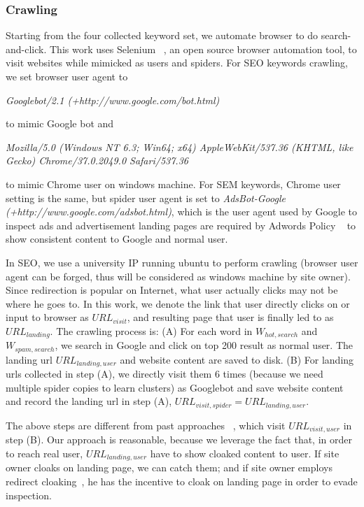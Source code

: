 \subsubsection{Crawling}
\label{sss:crawling}
Starting from the four collected keyword set, we automate browser to do
search-and-click. This work uses Selenium ~\cite{selenium}, an open source
browser automation tool, to visit websites while mimicked as users and spiders.
For SEO keywords crawling, we set browser user agent to 

{\it Googlebot/2.1
(+http://www.google.com/bot.html)}

to mimic Google bot and 

{\it Mozilla/5.0 (Windows NT 6.3; Win64; x64) AppleWebKit/537.36 (KHTML, like
Gecko) Chrome/37.0.2049.0 Safari/537.36}

to mimic Chrome user on windows
machine. For SEM keywords, Chrome user setting is the same, but spider user
agent is set to {\it AdsBot-Google (+http://www.google.com/adsbot.html)}, which
is the user agent used by Google to inspect ads and advertisement landing pages
are required by Adwords Policy ~\cite{google-ad-policy} to show consistent 
content to Google and normal user.

In SEO, we use a university IP running ubuntu to perform crawling (browser user
agent can be forged, thus will be considered as windows machine by site owner).
Since redirection is popular on Internet, what user actually clicks may not be
where he goes to. In this work, we denote the link that user directly clicks on
or input to browser as $URL_{visit}$, and resulting page that user is finally
led to as $URL_{landing}$.
The crawling process is: 
(A) For each word in $W_{hot, search}$ and $W_{spam, search}$, we search in Google
and click on top 200 result as normal user. The landing url $URL_{landing, user}$ 
and website content are saved to disk. 
(B) For landing urls collected in step (A), we directly visit them 6 times
(because we need multiple spider copies to learn clusters) as Googlebot and
save website content and record the landing url in step (A), $URL_{visit,
spider} = URL_{landing, user}$.

The above steps are different from past approaches ~\cite{lin2009detection,
wu2005cloaking, wang2011cloak}, which visit $URL_{visit, user}$ in step (B). Our
approach is reasonable, because we leverage the fact that, in order to reach
real user, $URL_{landing, user}$ have to show cloaked content to user. If 
site owner cloaks on landing page, we can catch them; and if site owner employs
redirect cloaking~\cite{wu2005cloaking}, he has the incentive to cloak on
landing page in order to evade inspection.


